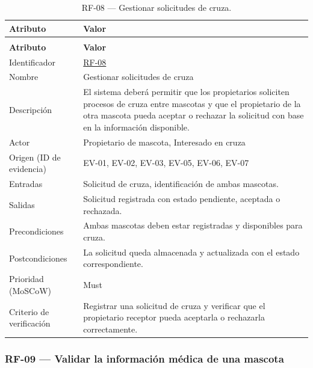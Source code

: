 \documentclass[journal,onecolumn]{IEEEtran}
\makeatletter
\newenvironment{atributos}[2]{%
	\small
	\begin{longtable}{@{}>{\raggedright\arraybackslash}p{4.2cm} >{\raggedright\arraybackslash}p{11.2cm}@{}}
		\caption{#2}\label{tab:#1}\\
		\toprule
		\textbf{Atributo} & \textbf{Valor} \\
		\midrule
		\endfirsthead
		\multicolumn{2}{@{}l}{\small\itshape (continuación)}\\
		\toprule
		\textbf{Atributo} & \textbf{Valor} \\
		\midrule
		\endhead
		\bottomrule
		\endlastfoot
	}{%
	\end{longtable}
	\normalsize
}
\makeatother
\begin{document}
	\begin{atributos}{RF-08}{RF-08 --- Gestionar solicitudes de cruza.}
		Identificador & \hyperref[tab:RF-08]{RF-08} \\
		Nombre & Gestionar solicitudes de cruza \\
		Descripción & El sistema deberá permitir que los propietarios soliciten procesos de cruza entre mascotas y que el propietario de la otra mascota pueda aceptar o rechazar la solicitud con base en la información disponible. \\
		Actor & Propietario de mascota, Interesado en cruza \\
		Origen (ID de evidencia) & EV-01, EV-02, EV-03, EV-05, EV-06, EV-07 \\
		Entradas & Solicitud de cruza, identificación de ambas mascotas. \\
		Salidas & Solicitud registrada con estado pendiente, aceptada o rechazada. \\
		Precondiciones & Ambas mascotas deben estar registradas y disponibles para cruza. \\
		Postcondiciones & La solicitud queda almacenada y actualizada con el estado correspondiente. \\
		Prioridad (MoSCoW) & Must \\
		Criterio de verificación & Registrar una solicitud de cruza y verificar que el propietario receptor pueda aceptarla o rechazarla correctamente. \\
	\end{atributos}
	
	\subsubsection{RF-09 --- Validar la información médica de una mascota}
	
\end{document}
